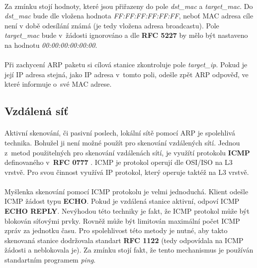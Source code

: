 \documentclass[a4paper,11pt,onecolumn,notitlepage]{article}
\begin{document}
\paragraph{} Za zmínku stojí hodnoty, které jsou přiřazeny do pole \emph{dst\_mac} a \emph{target\_mac}. Do \emph{dst\_mac} bude dle vložena hodnota \emph{FF:FF:FF:FF:FF:FF}, neboť MAC adresa cíle není v době odesílání známá (je tedy vložena adresa broadcastu). Pole \emph{target\_mac} bude v~žádosti ignorováno a dle \textbf{RFC 5227} \cite{RFC5227} by mělo být nastaveno na hodnotu \emph{00:00:00:00:00:00}.

\paragraph{} Při zachycení ARP paketu si cílová stanice zkontroluje pole \emph{target\_ip}. Pokud je její IP adresa stejná, jako IP adresa v~tomto poli, odešle zpět ARP odpověď, ve které informuje o~své MAC adrese.
\subsection{Vzdálená síť}\label{fig:CHAPTER_FOREIGN_NET}
\paragraph{} Aktivní skenování, či pasivní poslech, lokální sítě pomocí ARP je spolehlivá technika. Bohužel ji není možné použít pro skenování vzdálených sítí. Jednou z~metod použitelných pro skenování vzdálenách sítí, je využítí protokolu \textbf{ICMP} definovaného v~\textbf{RFC 0777} \cite{RFC0777}. ICMP je protokol operují dle OSI/ISO na L3 vrstvě. Pro svou činnost využívá IP protokol, který operuje taktéž na L3 vrstvě.

\paragraph{} Myšlenka skenování pomocí ICMP protokolu je velmi jednoduchá. Klient odešle ICMP žádost typu \textbf{ECHO}. Pokud je vzdálená stanice aktivní, odpoví ICMP \textbf{ECHO REPLY}. Nevýhodou této techniky je fakt, že ICMP protokol může být blokován síťovými prvky. Rovněž může být limitován maximální počet ICMP zpráv za jednotku času. Pro spolehlivost této metody je nutné, aby takto skenovaná stanice dodržovala standart \textbf{RFC 1122} \cite{RFC1122} (tedy odpovídala na ICMP žádosti a neblokovala je). Za zmínku stojí fakt, že tento mechanismus je používán standartním programem \emph{ping}.
\end{document}
